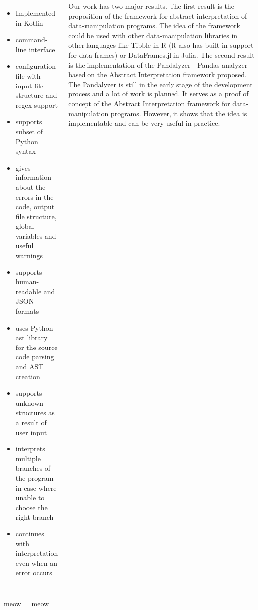 \documentclass{tikzposter}
\begin{document}
\begin{columns}
        {
            \Large
            \begin{itemize}
                \item Implemented in Kotlin
                \item command-line interface
                \item configuration file with input file structure and regex support
                \item supports subset of Python syntax
                \item gives information about the errors in the code, output file structure, global variables and useful warnings
                \item supports human-readable and JSON formats
                \item uses Python ast library for the source code parsing and AST creation
                \item supports unknown structures as a result of user input
                \item interprets multiple branches of the program in case where unable to choose the right branch
                \item continues with interpretation even when an error occurs
            \end{itemize} %
        }



        {
            \Large
            Our work has two major results.
            The first result is the proposition of the framework for abstract interpretation of data-manipulation programs.
            The idea of the framework could be used with other data-manipulation libraries in other languages like
            Tibble in R (R also has built-in support for data frames) or DataFrames.jl in Julia.
            The second result is the implementation of the Pandalyzer - Pandas analyzer based
            on the Abstract Interpretation framework proposed.
            The Pandalyzer is still in the early stage of the development process and a lot of work is planned.
            It serves as a proof of concept of the Abstract Interpretation framework for data-manipulation programs.
            However, it shows that the idea is implementable and can be very useful in practice.
        }

    \end{columns}



    \begin{columns}

         {meow}


         {meow}

    \end{columns}
\end{document}
